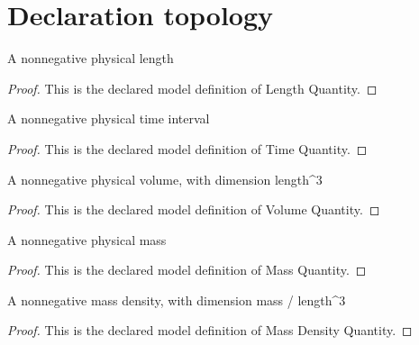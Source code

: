 \section{Declaration topology}
\begin{definition}
  \label{def:physics:phyx-mini-0234:phyxminiproblems-problemphyxmini0234-lengthquantity}
  A nonnegative physical length
\end{definition}
\begin{proof}
  This is the declared model definition of Length Quantity.
\end{proof}
\begin{definition}
  \label{def:physics:phyx-mini-0234:phyxminiproblems-problemphyxmini0234-timequantity}
  A nonnegative physical time interval
\end{definition}
\begin{proof}
  This is the declared model definition of Time Quantity.
\end{proof}
\begin{definition}
  \label{def:physics:phyx-mini-0234:phyxminiproblems-problemphyxmini0234-volumequantity}
  A nonnegative physical volume, with dimension length\textasciicircum{}3
\end{definition}
\begin{proof}
  This is the declared model definition of Volume Quantity.
\end{proof}
\begin{definition}
  \label{def:physics:phyx-mini-0234:phyxminiproblems-problemphyxmini0234-massquantity}
  A nonnegative physical mass
\end{definition}
\begin{proof}
  This is the declared model definition of Mass Quantity.
\end{proof}
\begin{definition}
  \label{def:physics:phyx-mini-0234:phyxminiproblems-problemphyxmini0234-massdensityquantity}
  A nonnegative mass density, with dimension mass / length\textasciicircum{}3
\end{definition}
\begin{proof}
  This is the declared model definition of Mass Density Quantity.
\end{proof}
